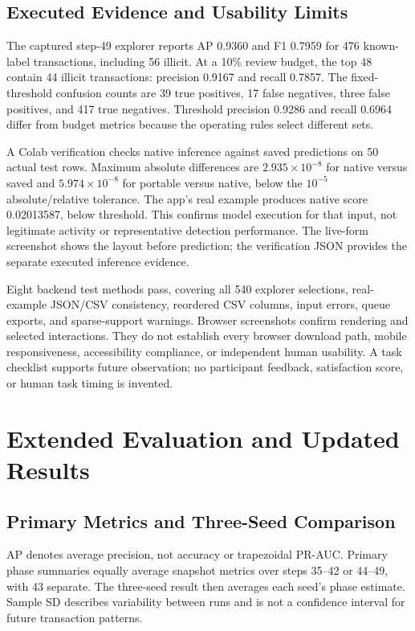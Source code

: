 \documentclass[conference]{IEEEtran}
\begin{document}
\subsection{Executed Evidence and Usability Limits}
The captured step-49 explorer reports AP 0.9360 and F1 0.7959 for 476 known-label transactions, including 56 illicit. At a 10\% review budget, the top 48 contain 44 illicit transactions: precision 0.9167 and recall 0.7857. The fixed-threshold confusion counts are 39 true positives, 17 false negatives, three false positives, and 417 true negatives. Threshold precision 0.9286 and recall 0.6964 differ from budget metrics because the operating rules select different sets.

A Colab verification checks native inference against saved predictions on 50 actual test rows. Maximum absolute differences are $2.935\times10^{-8}$ for native versus saved and $5.974\times10^{-8}$ for portable versus native, below the $10^{-5}$ absolute/relative tolerance. The app's real example produces native score 0.02013587, below threshold. This confirms model execution for that input, not legitimate activity or representative detection performance. The live-form screenshot shows the layout before prediction; the verification JSON provides the separate executed inference evidence.

Eight backend test methods pass, covering all 540 explorer selections, real-example JSON/CSV consistency, reordered CSV columns, input errors, queue exports, and sparse-support warnings. Browser screenshots confirm rendering and selected interactions. They do not establish every browser download path, mobile responsiveness, accessibility compliance, or independent human usability. A task checklist supports future observation; no participant feedback, satisfaction score, or human task timing is invented.

\section{Extended Evaluation and Updated Results}
\subsection{Primary Metrics and Three-Seed Comparison}
AP denotes average precision, not accuracy or trapezoidal PR-AUC. Primary phase summaries equally average snapshot metrics over steps 35--42 or 44--49, with 43 separate. The three-seed result then averages each seed's phase estimate. Sample SD describes variability between runs and is not a confidence interval for future transaction patterns.
\end{document}
